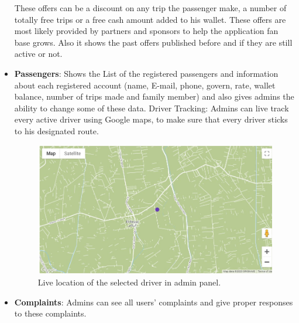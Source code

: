 \begin{itemize}
 These offers can be a discount on any trip the passenger make, a number of totally free trips or a free cash amount added to his wallet. These offers are most likely provided by partners and sponsors to help the application fan base grows. Also it shows the past offers published before and if they are still active or not.
 
\item\textbf{Passengers}: Shows the List of the registered passengers and information about each registered account (name, E-mail, phone, govern, rate, wallet balance, number of trips made and family member) and also gives admins the ability to change some of these data.
Driver Tracking: Admins can live track every active driver using Google maps, to make sure that every driver sticks to his designated route.
\newline
\begin{figure}[htp]%
    \center%
    \includegraphics[width=1\textwidth]{images/ch5/fig2.jpg}%
    \caption[Live location of the selected driver in admin panel.]{Live location of the selected driver in admin panel.}\label{fig:fig2}%
  \end{figure}
  \newline

\item\textbf{Complaints}: Admins can see all users’ complaints and give proper responses to these complaints. 


\end{itemize}
